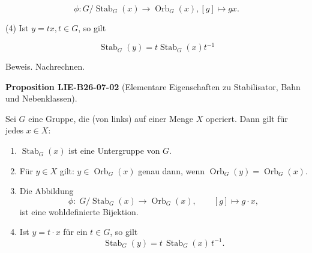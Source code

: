 \documentclass[10pt, letterpaper]{article}
\newcommand{\CustomHeading}[3]{%
  \par\medskip\noindent%
  \textbf{#1 #2} \textnormal{(#3)}.\enskip%
}
\newenvironment{PROP}[2]{\begin{unitbox}\CustomHeading{Proposition}{#1}{#2}}{\end{unitbox}}
\begin{document}
$$
\phi: G / \operatorname{Stab}_{G}(x) \rightarrow \operatorname{Orb}_{G}(x),[g] \mapsto g x .
$$

(4) Ist $y=t x, t \in G$, so gilt

$$
\operatorname{Stab}_{G}(y)=t \operatorname{Stab}_{G}(x) t^{-1}
$$

Beweis. Nachrechnen.



\begin{PROP}{LIE-B26-07-02}{Elementare Eigenschaften zu Stabilisator, Bahn und Nebenklassen}
Sei $G$ eine Gruppe, die (von links) auf einer Menge $X$ operiert. Dann gilt für jedes $x\in X$:
\begin{enumerate}
\item $\operatorname{Stab}_G(x)$ ist eine Untergruppe von $G$.
\item Für $y\in X$ gilt: $y\in \operatorname{Orb}_G(x)$ genau dann, wenn $\operatorname{Orb}_G(y)=\operatorname{Orb}_G(x)$.
\item Die Abbildung
\[
\phi:\; G/\operatorname{Stab}_G(x)\longrightarrow \operatorname{Orb}_G(x),\qquad [g]\longmapsto g\cdot x,
\]
ist eine wohldefinierte Bijektion.
\item Ist $y=t\cdot x$ für ein $t\in G$, so gilt
\[
\operatorname{Stab}_G(y)=t\,\operatorname{Stab}_G(x)\,t^{-1}.
\]
\end{enumerate}
\end{PROP}
\end{document}
